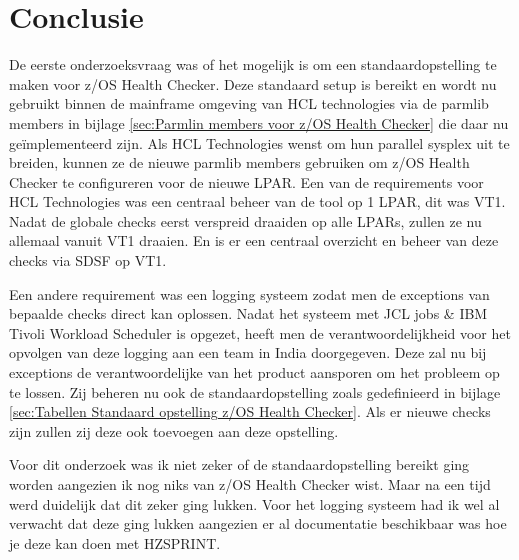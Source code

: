 
\chapter{Conclusie}
\label{ch:conclusie}


De eerste onderzoeksvraag was of het mogelijk is om een standaardopstelling te maken voor z/OS Health Checker. Deze standaard setup is bereikt en wordt nu gebruikt binnen de mainframe omgeving van HCL technologies via de parmlib members in bijlage \ref{sec:Parmlin members voor z/OS Health Checker} die daar nu geïmplementeerd zijn. Als HCL Technologies wenst om hun parallel sysplex uit te breiden, kunnen ze de nieuwe parmlib members gebruiken om z/OS Health Checker te configureren voor de nieuwe LPAR. Een van de requirements voor HCL Technologies was een centraal beheer van de tool op 1 LPAR, dit was VT1. Nadat de globale checks eerst verspreid draaiden op alle LPARs, zullen ze nu allemaal vanuit VT1 draaien. En is er een centraal overzicht en beheer van deze checks via SDSF op VT1. 

Een andere requirement was een logging systeem zodat men de exceptions van bepaalde checks direct kan oplossen. Nadat het systeem met JCL jobs \& IBM Tivoli Workload Scheduler is opgezet, heeft men de verantwoordelijkheid voor het opvolgen van deze logging aan een team in India doorgegeven. Deze zal nu bij exceptions de verantwoordelijke van het product aansporen om het probleem op te lossen. Zij beheren nu ook de standaardopstelling zoals gedefinieerd in bijlage \ref{sec:Tabellen Standaard opstelling z/OS Health Checker}. Als er nieuwe checks zijn zullen zij deze ook toevoegen aan deze opstelling.

Voor dit onderzoek was ik niet zeker of de standaardopstelling bereikt ging worden aangezien ik nog niks van z/OS Health Checker wist. Maar na een tijd werd duidelijk dat dit zeker ging lukken. Voor het logging systeem had ik wel al verwacht dat deze ging lukken aangezien er al documentatie beschikbaar was hoe je deze kan doen met HZSPRINT.

